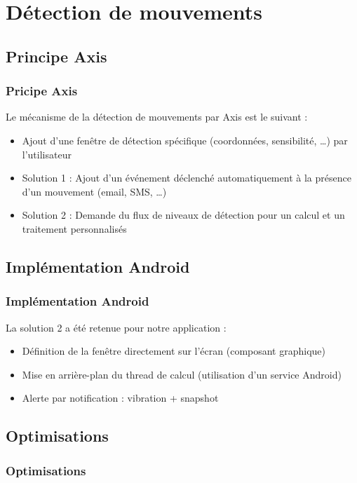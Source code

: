 \documentclass{beamer}
\begin{document}
\section{Détection de mouvements}
\subsection{Principe Axis}
 \begin{frame}
   \frametitle{Pricipe Axis}
    Le mécanisme de la détection de mouvements par Axis est le suivant :
   \begin{itemize}
    \item Ajout d'une fenêtre de détection spécifique (coordonnées,
    sensibilité, \ldots) par l'utilisateur
    \item Solution 1 : Ajout d'un événement déclenché automatiquement à la
    présence d'un mouvement (email, SMS, \ldots)
    \item Solution 2 : Demande du flux de niveaux de détection pour un
    calcul et un traitement personnalisés
   \end{itemize}
\end{frame}

\subsection{Implémentation Android}
 \begin{frame}
   \frametitle{Implémentation Android}
    La solution 2 a été retenue pour notre application :
    \begin{itemize}
    \item Définition de la fenêtre directement sur l'écran (composant
    graphique)
    \item Mise en arrière-plan du thread de calcul (utilisation d'un service
    Android)
    \item Alerte par notification : vibration + snapshot
   \end{itemize}
\end{frame}








\subsection{Optimisations}
 \begin{frame}
   \frametitle{Optimisations}

\end{frame}


\end{document}
